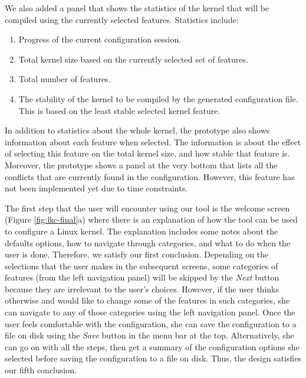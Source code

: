 \documentclass{chi2009}
\begin{document}
We also added a panel that shows the statistics of the kernel that will be compiled using the currently selected features. Statistics include:
\begin{enumerate}
 \item Progress of the current configuration session.
 \item Total kernel size based on the currently selected set of features.
 \item Total number of features.
 \item The stability of the kernel to be compiled by the generated configuration file. This is based on the least stable selected kernel feature.
\end{enumerate}

In addition to statistics about the whole kernel, the prototype also shows information about each feature when selected. The information is about the effect
of selecting this feature on the total kernel size, and how stable that feature is. Moreover, the prototype shows a panel at the very bottom that lists all the
conflicts that are currently found in the configuration. However, this feature has not been implemented yet due to time constraints.

The first step that the user will encounter using our tool is the welcome screen (Figure \ref{fig:lkc-final}a) where there is an explanation of how the tool
can be used to configure a Linux kernel. The explanation includes some notes about the defaults options, how to navigate through categories, and what to do
when the user is done. Therefore, we satisfy our first conclusion. Depending on the selections that the user makes in the subsequent screens, some categories of
features (from the left navigation panel) will be skipped by the \textit{Next} button because they are irrelevant to the user's choices. However, if the user
thinks otherwise and would like to change some of the features in such categories, she can navigate to any of those categories using the left navigation panel.
Once the user feels comfortable with the configuration, she can save the configuration to a file on disk using the \textit{Save} button in the menu bar at the
top. Alternatively, she can go on with all the steps, then get a summary of the configuration options she selected before saving the configuration to a file on
disk. Thus, the design satisfies our fifth conclusion.
\end{document}
